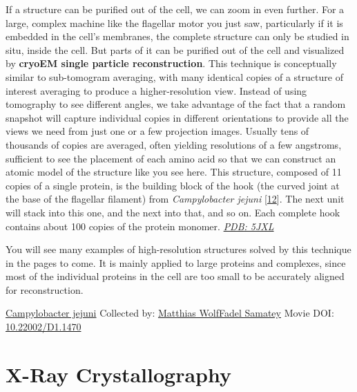 \documentclass[]{tufte-book}
\begin{document}
If a structure can be purified out of the cell, we can zoom in even further. For a large, complex machine like the flagellar motor you just saw, particularly if it is embedded in the cell's membranes, the complete structure can only be studied in situ, inside the cell. But parts of it can be purified out of the cell and visualized by \textbf{cryoEM single particle reconstruction}. This technique is conceptually similar to sub-tomogram averaging, with many identical copies of a structure of interest averaging to produce a higher-resolution view. Instead of using tomography to see different angles, we take advantage of the fact that a random snapshot will capture individual copies in different orientations to provide all the views we need from just one or a few projection images. Usually tens of thousands of copies are averaged, often yielding resolutions of a few angstroms, sufficient to see the placement of each amino acid so that we can construct an atomic model of the structure like you see here. This structure, composed of 11 copies of a single protein, is the building block of the hook (the curved joint at the base of the flagellar filament) from \emph{Campylobacter jejuni} {[}\protect\hyperlink{ref-matsunami2016}{12}{]}. The next unit will stack into this one, and the next into that, and so on. Each complete hook contains about 100 copies of the protein monomer. \href{http://rcsb.org/structure/5JXL}{\emph{PDB: 5JXL}}

You will see many examples of high-resolution structures solved by this technique in the pages to come. It is mainly applied to large proteins and complexes, since most of the individual proteins in the cell are too small to be accurately aligned for reconstruction.



\hypertarget{htmlwidget-ac9a10062be5b04b8fc9}{}

\label{fig:1-8}\protect\hyperlink{tree}{Campylobacter jejuni} Collected by: \protect\hyperlink{matthias_wolffadel_samatey}{Matthias WolfFadel Samatey} Movie DOI: \href{https://doi.org/10.22002/D1.1470}{10.22002/D1.1470}

\hypertarget{x-ray-crystallography}{%
\section{X-Ray Crystallography}\label{x-ray-crystallography}}
\end{document}

